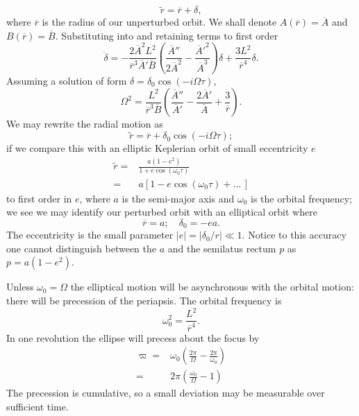 \begin{equation}
\widetilde{r} = \overline{r} + \delta,
\end{equation}
where $\overline{r}$ is the radius of our unperturbed orbit. We shall denote $A(\overline{r}) = \overline{A}$ and $B(\overline{r}) = \overline{B}$. Substituting into  and retaining terms to first order
\begin{equation}
\ddot{\delta} = - \frac{2\overline{A}^2L^2}{\overline{r}^3\overline{A}'\overline{B}}\left(\frac{\overline{A}''}{2\overline{A}^2} - \frac{{\overline{A}'}^2}{\overline{A}^3}\right)\delta + \frac{3L^2}{\overline{r}^4}\delta.
\end{equation}
Assuming a solution of form $\delta = \delta_0\cos(-i\Omega\tau)$,
\begin{equation}
\Omega^2 = \frac{L^2}{\overline{r}^3\overline{B}}\left(\frac{\overline{A}''}{\overline{A}'} - \frac{2\overline{A}'}{\overline{A}} + \frac{3}{\overline{r}}\right).
\end{equation}
We may rewrite the radial motion as
\begin{equation}
\widetilde{r} = \overline{r} + \delta_0\cos(-i\Omega\tau);
\end{equation}
if we compare this with an elliptic Keplerian orbit of small eccentricity $e$
\begin{align}
\widetilde{r} = {} & \frac{a(1 - e^2)}{1 + e\cos(\omega_0\tau)} \\
 = {} & a\left[1 - e\cos(\omega_0\tau) + \ldots \, \right]
\end{align}
to first order in $e$, where $a$ is the semi-major axis and $\omega_0$ is the orbital frequency; we see we may identify our perturbed orbit with an elliptical orbit where\cite{Kerner2001a}
\begin{equation}
\overline{r} = a; \quad \delta_0 = -ea.
\end{equation}
The eccentricity is the small parameter $|e| = |\delta_0/r| \ll 1$. Notice to this accuracy one cannot distinguish between the $a$ and the semilatus rectum $p$ as $p = a(1 - e^2)$.

Unless $\omega_0 = \Omega$ the elliptical motion will be asynchronous with the orbital motion: there will be precession of the periapsis. The orbital frequency is
\begin{equation}
\omega_0^2 = \frac{L^2}{\overline{r}^4}.
\end{equation}
In one revolution the ellipse will precess about the focus by
\begin{align}
\varpi = {} & \omega_0\left(\frac{2\pi}{\Omega} - \frac{2\pi}{\omega_0}\right) \nonumber \\
 = {} & 2\pi\left(\frac{\omega_0}{\Omega} - 1\right)
\end{align}
The precession is cumulative, so a small deviation may be measurable over sufficient time.

